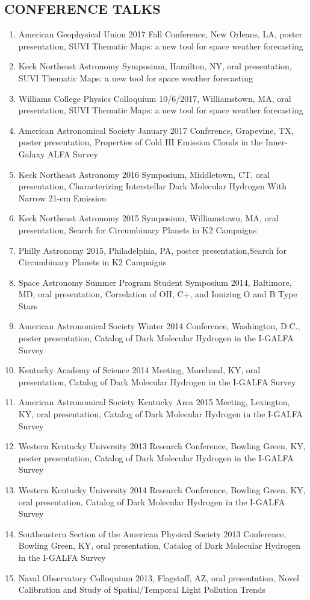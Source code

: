 \documentclass[line,margin]{res}
\begin{document}
\begin{resume}
  \section{CONFERENCE TALKS	}
  \begin{enumerate}[leftmargin=*]
    \item American Geophysical Union 2017 Fall Conference, New Orleans, LA, poster presentation, SUVI
    Thematic Maps: a new tool for space weather forecasting
    \item Keck Northeast Astronomy Symposium, Hamilton, NY, oral presentation, SUVI Thematic
    Maps: a new tool for space weather forecasting
    \item Williams College Physics Colloquium 10/6/2017, Williamstown, MA, oral presentation,
    SUVI Thematic Maps: a new tool for space weather forecasting
    \item American Astronomical Society January 2017 Conference, Grapevine, TX, poster
    presentation, Properties of Cold HI Emission Clouds in the Inner-Galaxy ALFA Survey
    \item Keck Northeast Astronomy 2016 Symposium, Middletown, CT, oral presentation,
    Characterizing Interstellar Dark Molecular Hydrogen With Narrow 21-cm Emission
    \item Keck Northeast Astronomy 2015 Symposium, Williamstown, MA, oral presentation,
    Search for Circumbinary Planets in K2 Campaigns
    \item Philly Astronomy 2015, Philadelphia, PA, poster presentation,Search for Circumbinary
    Planets in K2 Campaigns
    \item Space Astronomy Summer Program Student Symposium 2014, Baltimore, MD, oral
    presentation, Correlation of OH, C+, and Ionizing O and B Type Stars
    \item American Astronomical Society Winter 2014 Conference, Washington, D.C., poster
    presentation, Catalog of Dark Molecular Hydrogen in the I-GALFA Survey
    \item Kentucky Academy of Science 2014 Meeting, Morehead, KY, oral presentation, Catalog
    of Dark Molecular Hydrogen in the I-GALFA Survey
    \item American Astronomical Society Kentucky Area 2015 Meeting, Lexington, KY, oral
    presentation, Catalog of Dark Molecular Hydrogen in the I-GALFA Survey
    \item Western Kentucky University 2013 Research Conference, Bowling Green, KY, poster
    presentation, Catalog of Dark Molecular Hydrogen in the I-GALFA Survey
    \item Western Kentucky University 2014 Research Conference, Bowling Green, KY, oral
    presentation, Catalog of Dark Molecular Hydrogen in the I-GALFA Survey
    \item Southeastern Section of the American Physical Society 2013 Conference, Bowling
    Green, KY, oral presentation, Catalog of Dark Molecular Hydrogen in the I-GALFA Survey
    \item Naval Observatory Colloquium 2013, Flagstaff, AZ, oral presentation, Novel Calibration
      and Study of Spatial/Temporal Light Pollution Trends
    \end{enumerate}
    

\end{resume}
\end{document}
